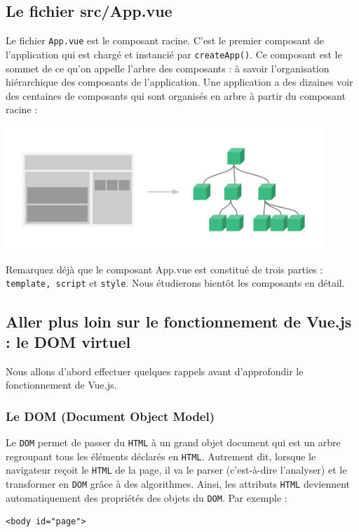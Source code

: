 \documentclass{article}
\begin{document}
\subsection{Le fichier {\color{monOrange}src/App.vue}}
Le fichier {\tt App.vue} est le composant racine. C'est le premier composant de l'application qui est chargé et instancié par {\tt createApp()}. Ce composant est le sommet de ce qu'on appelle l'arbre des composants : à savoir l'organisation hiérarchique des composants de l'application. Une application a des dizaines voir des centaines de composants qui sont organisés en arbre à partir du composant racine :
\begin{center}
\includegraphics[width=12cm]{images/image06.png}
\end{center}

Remarquez déjà que le composant {\color{monOrange}App.vue} est constitué de trois parties : {\tt template, script} et {\tt style}. Nous étudierons bientôt les composants en détail.

\subsection{Aller plus loin sur le fonctionnement de Vue.js : le {\color{monOrange}DOM virtuel}}
Nous allons d'abord effectuer quelques rappels avant d'approfondir le fonctionnement de Vue.js.
\subsubsection{Le DOM (Document Object Model)}
Le {\tt DOM} permet de passer du {\tt HTML} à un grand objet document qui est un arbre regroupant tous les éléments déclarés en {\tt HTML}. Autrement dit, lorsque le navigateur reçoit le {\tt HTML} de la page, il va le parser (c'est-à-dire l'analyser) et le transformer en {\tt DOM} grâce à des algorithmes. Ainsi, les attributs {\tt HTML} deviennent automatiquement des propriétés des objets du {\tt DOM}. Par exemple :
\begin{verbatim}
<body id="page">
\end{verbatim} 
\end{document}
